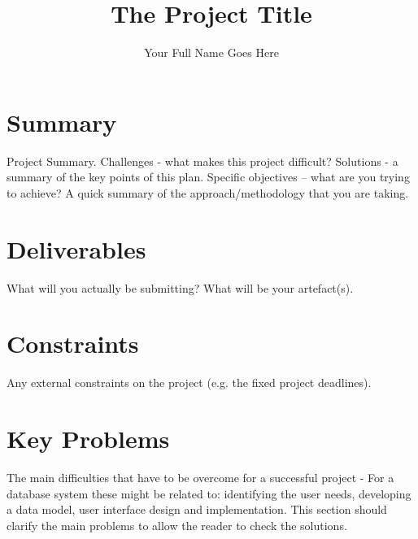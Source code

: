 \documentclass[a4paper,11pt]{techplan}
\author{Your Full Name Goes Here}
\title{The Project Title}
\begin{document}
\maketitle

\section*{Summary}

Project Summary. Challenges - what makes this project difficult? Solutions - a summary of the key points of this plan. Specific objectives – what are you trying to achieve? A quick summary of the approach/methodology that you are taking.

\section*{Deliverables}

What will you actually be submitting? What will be your artefact(s).

\section*{Constraints}

Any external constraints on the project (e.g. the fixed project deadlines).

\section*{Key Problems}

The main difficulties that have to be overcome for a successful project - For a database system these might be related to: identifying the user needs, developing a data model, user interface design and implementation.  This section should clarify the main problems to allow the reader to check the solutions.
\end{document}
